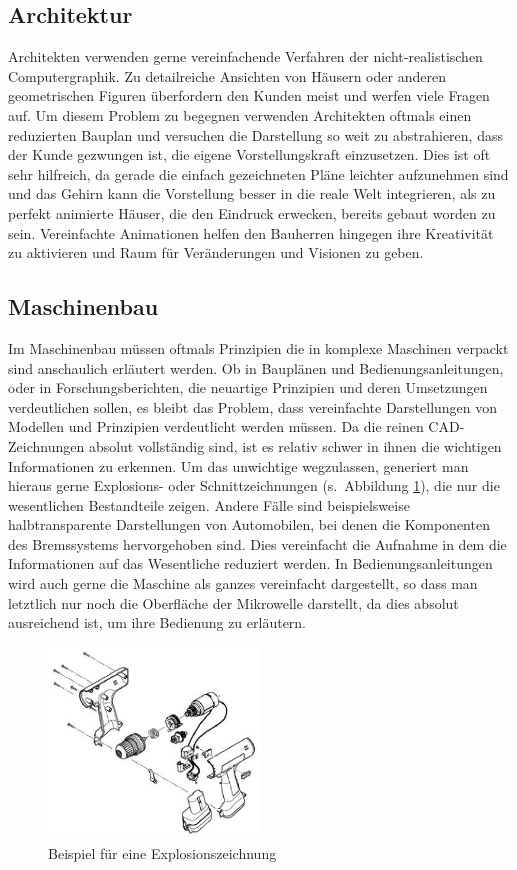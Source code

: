 \subsection{Architektur}
Architekten verwenden gerne vereinfachende Verfahren der nicht-realistischen 
Computergraphik. Zu detailreiche Ansichten von Häusern oder anderen 
geometrischen Figuren überfordern den Kunden meist und werfen viele Fragen auf. 
Um diesem Problem zu begegnen verwenden Architekten oftmals einen reduzierten 
Bauplan und versuchen die Darstellung so weit zu abstrahieren, dass der Kunde 
gezwungen ist, die eigene Vorstellungskraft einzusetzen. Dies ist oft sehr 
hilfreich, da gerade die einfach gezeichneten Pläne leichter aufzunehmen sind 
und das Gehirn kann die Vorstellung besser in die reale Welt integrieren, als 
zu perfekt animierte Häuser, die den Eindruck erwecken, bereits gebaut worden 
zu sein. Vereinfachte Animationen helfen den Bauherren hingegen ihre 
Kreativität zu aktivieren und Raum für Veränderungen und Visionen zu geben.

\subsection{Maschinenbau}
Im Maschinenbau müssen oftmals Prinzipien die in komplexe Maschinen verpackt 
sind anschaulich erläutert werden. Ob in Bauplänen und Bedienungsanleitungen, 
oder in Forschungsberichten, die neuartige Prinzipien und deren Umsetzungen 
verdeutlichen sollen, es bleibt das Problem, dass vereinfachte Darstellungen 
von Modellen und Prinzipien verdeutlicht werden müssen. Da die reinen 
CAD-Zeichnungen absolut vollständig sind, ist es relativ schwer in ihnen die 
wichtigen Informationen zu erkennen. Um das unwichtige wegzulassen, generiert 
man hieraus gerne Explosions- oder Schnittzeichnungen (s.\ Abbildung 
\ref{fig:explosion}), die nur die wesentlichen Bestandteile zeigen. Andere 
Fälle sind beispielsweise halbtransparente Darstellungen von Automobilen, bei 
denen die Komponenten des Bremssystems hervorgehoben sind. Dies vereinfacht die 
Aufnahme in dem die Informationen auf das Wesentliche reduziert werden. In 
Bedienungsanleitungen wird auch gerne die Maschine als ganzes vereinfacht 
dargestellt, so dass man letztlich nur noch die Oberfläche der Mikrowelle 
darstellt, da dies absolut ausreichend ist, um ihre Bedienung zu erläutern.

\begin{figure}
  \centering
  \includegraphics[width=0.5\textwidth]{../images/explosion}
  \caption{Beispiel für eine Explosionszeichnung}
  \label{fig:explosion}
\end{figure}

